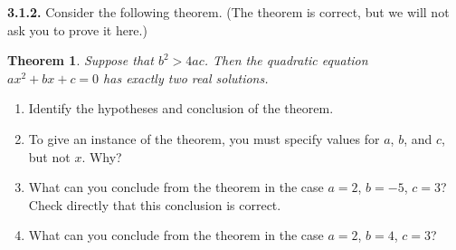 \documentclass[12pt]{amsart}
\newenvironment{statement}[1]{\smallskip\noindent\color[rgb]{.6627, .3529, .6314} {\bf #1.}}{}
\newtheorem{theorem}{Theorem}
\theoremstyle{definition}
\theoremstyle{remark}
\begin{document}
\begin{statement}{3.1.2}
Consider the following theorem.
(The theorem is correct, but we will not ask you to prove it here.)
\begin{theorem}
	Suppose that $b^2 > 4ac$.
	Then the quadratic equation $ax^2 + bx + c = 0$ has exactly two real solutions.
\end{theorem}
\begin{enumerate}
	\item Identify the hypotheses and conclusion of the theorem.
	
	\item To give an instance of the theorem, you must specify values for $a$, $b$, and $c$, but not $x$.
	Why?
	
	\item What can you conclude from the theorem in the case $a = 2$, $b = -5$, $c = 3$?
	Check directly that this conclusion is correct.
	
	\item What can you conclude from the theorem in the case $a = 2$, $b = 4$, $c = 3$?
\end{enumerate}
\end{statement}
\end{document}
